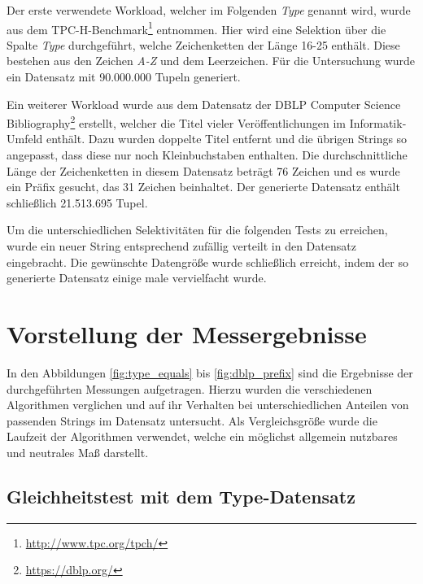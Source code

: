 Der erste verwendete Workload, welcher im Folgenden \emph{Type} genannt wird, wurde aus dem TPC-H-Benchmark\footnote{\url{http://www.tpc.org/tpch/}} entnommen.
Hier wird eine Selektion über die Spalte \emph{Type} durchgeführt, welche Zeichenketten der Länge 16-25 enthält.
Diese bestehen aus den Zeichen \emph{A-Z} und dem Leerzeichen.
Für die Untersuchung wurde ein Datensatz mit 90.000.000 Tupeln generiert.

Ein weiterer Workload wurde aus dem Datensatz der DBLP Computer Science Bibliography\footnote{\url{https://dblp.org/}} erstellt, welcher die Titel vieler Veröffentlichungen im Informatik-Umfeld enthält.
Dazu wurden doppelte Titel entfernt und die übrigen Strings so angepasst, dass diese nur noch Kleinbuchstaben enthalten.
Die durchschnittliche Länge der Zeichenketten in diesem Datensatz beträgt 76 Zeichen und es wurde ein Präfix gesucht, das 31 Zeichen beinhaltet.
Der generierte Datensatz enthält schließlich 21.513.695 Tupel.

Um die unterschiedlichen Selektivitäten für die folgenden Tests zu erreichen, wurde ein neuer String entsprechend zufällig verteilt in den Datensatz eingebracht.
Die gewünschte Datengröße wurde schließlich erreicht, indem der so generierte Datensatz einige male vervielfacht wurde.

\section{Vorstellung der Messergebnisse}

In den Abbildungen \ref{fig:type_equals} bis \ref{fig:dblp_prefix} sind die Ergebnisse der durchgeführten Messungen aufgetragen.
Hierzu wurden die verschiedenen Algorithmen verglichen und auf ihr Verhalten bei unterschiedlichen Anteilen von passenden Strings im Datensatz untersucht.
Als Vergleichsgröße wurde die Laufzeit der Algorithmen verwendet, welche ein möglichst allgemein nutzbares und neutrales Maß darstellt.

\subsection{Gleichheitstest mit dem Type-Datensatz}

